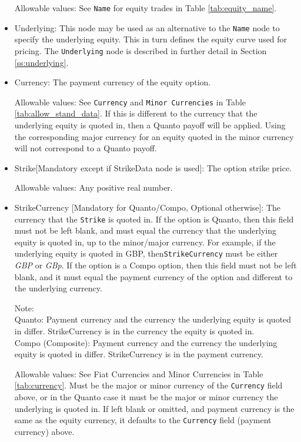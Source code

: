 \begin{itemize}
	Allowable values: See \lstinline!Name! for equity trades in Table \ref{tab:equity_name}.
	
	\item Underlying: This node may be used as an alternative to the \lstinline!Name! node to
	specify the underlying equity. This in turn defines the equity curve used for pricing. The
	\lstinline!Underlying! node is described in further detail in Section \ref{ss:underlying}. \\
	
	\item Currency: The payment currency of the equity option. 
	
	Allowable values: See \lstinline!Currency! and \lstinline!Minor Currencies! in Table
	\ref{tab:allow_stand_data}.	If this is different to the currency that the underlying equity
	is quoted in, then a Quanto payoff will be applied. Using the corresponding major currency
	for an equity quoted in the minor currency will not correspond to a Quanto payoff.
	
	\item Strike[Mandatory except if StrikeData node is used]: The option strike price.
	
	Allowable values: Any positive real number.	
	
	\item StrikeCurrency [Mandatory for Quanto/Compo, Optional otherwise]: The currency that the \lstinline!Strike! is quoted in. If
	the option is Quanto, then this field must not be left blank, and must equal the currency
	that the underlying equity is quoted in, up to the minor/major currency. For example, if 
	the underlying equity is quoted in GBP, then\lstinline!StrikeCurrency! must be either
	\emph{GBP} or \emph{GBp}. If the option is a Compo option, then this field must not be 
	left blank, and it must equal the payment currency of the option and different to the 
	underlying currency.
	
	Note:\\
	Quanto: Payment currency and the currency the underlying equity is quoted in differ. StrikeCurrency is in the currency the equity is quoted in.\\
	Compo (Composite): Payment currency and the currency the underlying equity is quoted in differ. StrikeCurrency is in the payment currency.
	
	Allowable values: See Fiat Currencies and Minor Currencies in Table
	\ref{tab:currency}.	Must be the major or minor currency of the \lstinline!Currency!
	field above, or in the Quanto case it must be the major or minor currency the underlying is quoted in. If left blank or omitted, and payment currency is the same as the equity currency, it defaults to the \lstinline!Currency! field (payment currency) above.


\end{itemize}
